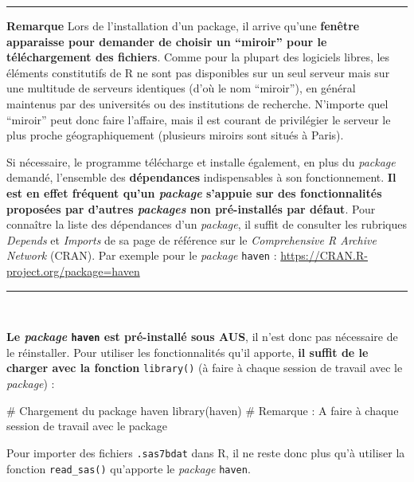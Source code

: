 \documentclass[12pt,twosided, notitlepage]{book}
\newenvironment{Shaded}{}{}
\newcommand{\KeywordTok}[1]{\textcolor[rgb]{0.00,0.00,1.00}{#1}}
\newcommand{\CommentTok}[1]{\textcolor[rgb]{0.00,0.50,0.00}{#1}}
\newcommand{\NormalTok}[1]{#1}
\renewenvironment{Shaded}{\begin{snugshade}}{\end{snugshade}}
\begin{document}
\begin{center}\rule{0.5\linewidth}{\linethickness}\end{center}

\textbf{Remarque} Lors de l'installation d'un package, il arrive qu'une
\textbf{fenêtre apparaisse pour demander de choisir un \enquote{miroir}
pour le téléchargement des fichiers}. Comme pour la plupart des
logiciels libres, les éléments constitutifs de R ne sont pas disponibles
sur un seul serveur mais sur une multitude de serveurs identiques (d'où
le nom \enquote{miroir}), en général maintenus par des universités ou
des institutions de recherche. N'importe quel \enquote{miroir} peut donc
faire l'affaire, mais il est courant de privilégier le serveur le plus
proche géographiquement (plusieurs miroirs sont situés à Paris).

Si nécessaire, le programme télécharge et installe également, en plus du
\emph{package} demandé, l'ensemble des \textbf{dépendances}
indispensables à son fonctionnement. \textbf{Il est en effet fréquent
qu'un \emph{package} s'appuie sur des fonctionnalités proposées par
d'autres \emph{packages} non pré-installés par défaut}. Pour connaître
la liste des dépendances d'un \emph{package}, il suffit de consulter les
rubriques \emph{Depends} et \emph{Imports} de sa page de référence sur
le \emph{Comprehensive R Archive Network} (CRAN). Par exemple pour le
\emph{package} \texttt{haven} :
\url{https://CRAN.R-project.org/package=haven}

\begin{center}\rule{0.5\linewidth}{\linethickness}\end{center}

~

\textbf{Le \emph{package} \texttt{haven} est pré-installé sous AUS}, il
n'est donc pas nécessaire de le réinstaller. Pour utiliser les
fonctionnalités qu'il apporte, \textbf{il suffit de le charger avec la
fonction} \texttt{library()} (à faire à
chaque session de travail avec le \emph{package}) :

\begin{Shaded}
\begin{Highlighting}[]
\CommentTok{# Chargement du package haven}
\KeywordTok{library}\NormalTok{(haven)}
\CommentTok{# Remarque : A faire à chaque session de travail avec le package}
\end{Highlighting}
\end{Shaded}

Pour importer des fichiers \texttt{.sas7bdat} dans R, il ne reste donc
plus qu'à utiliser la fonction
\texttt{read\_sas()} qu'apporte le
\emph{package} \texttt{haven}.
\end{document}
